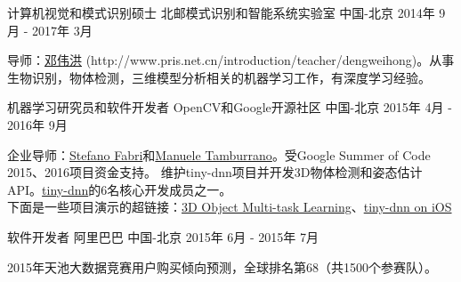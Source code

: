 


\begin{cventries}


\cventry
{计算机视觉和模式识别硕士} %
{北邮模式识别和智能系统实验室} %
{中国-北京} %
{2014年 9月 - 2017年 3月} %
{ %
\begin{cvitems}
\item {导师：\href{http://www.pris.net.cn/introduction/teacher/dengweihong}{邓伟洪} (http://www.pris.net.cn/introduction/teacher/dengweihong)。从事生物识别，物体检测，三维模型分析相关的机器学习工作，有深度学习经验。}
\end{cvitems}
}

\cventry
{机器学习研究员和软件开发者} %
{OpenCV和Google开源社区} %
{中国-北京} %
{2015年 4月 - 2016年 9月} %
{ %
\begin{cvitems}
\item {企业导师：\href{https://www.linkedin.com/in/stefano-fabri-16a73748}{Stefano Fabri}和\href{https://www.linkedin.com/in/manuele-tamburrano-b82384a5?authType=name&authToken=Di5p&trk=prof-sb-browse_map-name}{Manuele Tamburrano}。受Google Summer of Code 2015、2016项目资金支持。 维护tiny-dnn项目并开发3D物体检测和姿态估计API。\href{https://github.com/tiny-dnn/tiny-dnn}{tiny-dnn}的6名核心开发成员之一。\\
下面是一些项目演示的超链接：\href{https://www.youtube.com/watch?v=Mc20rTYdXTE}{3D Object Multi-task Learning}、\href{https://drive.google.com/open?id=0B-RYa1FDOrYXVUEzcG1mdnl5a3M}{tiny-dnn on iOS}
}
\end{cvitems}
}


\cventry
{软件开发者} %
{阿里巴巴} %
{中国-北京} %
{2015年 6月 - 2015年 7月} %
{ %
\begin{cvitems}
\item {2015年天池大数据竞赛用户购买倾向预测，全球排名第68（共1500个参赛队）。}
\end{cvitems}
}


\end{cventries}
